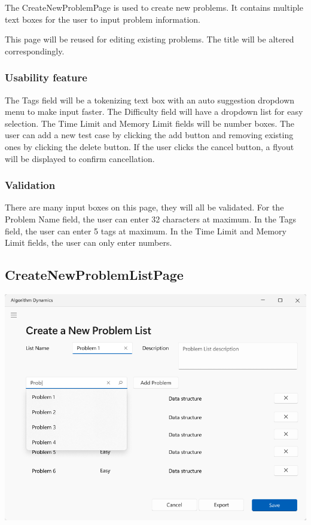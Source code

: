 \documentclass[a4paper]{report}
\begin{document}
The CreateNewProblemPage is used to create new problems. It contains multiple text boxes for the user to input problem information.

This page will be reused for editing existing problems. The title will be altered correspondingly.

\subsubsection{Usability feature}

The Tags field will be a tokenizing text box with an auto suggestion dropdown menu to make input faster. The Difficulty field will have a dropdown list for easy selection. The Time Limit and Memory Limit fields will be number boxes. The user can add a new test case by clicking the add button and removing existing ones by clicking the delete button. If the user clicks the cancel button, a flyout will be displayed to confirm cancellation.

\subsubsection{Validation}

There are many input boxes on this page, they will all be validated. For the Problem Name field, the user can enter 32 characters at maximum. In the Tags field, the user can enter 5 tags at maximum. In the Time Limit and Memory Limit fields, the user can only enter numbers.

\subsection{CreateNewProblemListPage}
\label{sec:CreateNewProblemListPageDesign}

\includegraphics[width=\textwidth, height=\textheight, keepaspectratio]{CreateNewProblemListPage-design}
\end{document}
